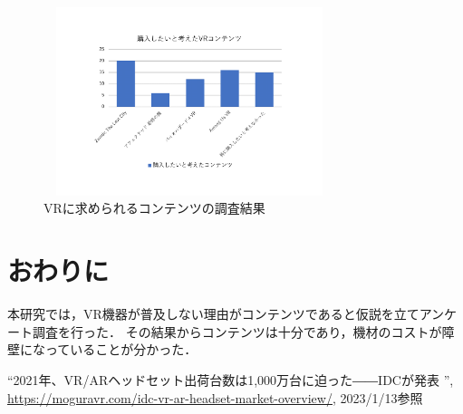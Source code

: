 \documentclass[twocolumn,10pt,a4j]{ltjsarticle}
\begin{document}
\begin{figure}[h]
\begin{center}
 \includegraphics[clip,width=85mm,height=55mm]{購入したいと考えたvrコンテンツ.pdf}
\end{center}
 \caption{VRに求められるコンテンツの調査結果}
 \label{fig:購入したいと考えたvrコンテンツ.pdf}
\end{figure}


\section{おわりに}
本研究では，VR機器が普及しない理由がコンテンツであると仮説を立てアンケート調査を行った．
その結果からコンテンツは十分であり，機材のコストが障壁になっていることが分かった．

\begin{thebibliography}{99}

  ``2021年、VR/ARヘッドセット出荷台数は1,000万台に迫った――IDCが発表
'', \url{https://moguravr.com/idc-vr-ar-headset-market-overview/}, 2023/1/13参照

\end{thebibliography}
\end{document}
